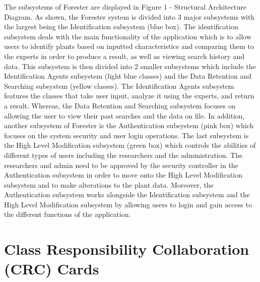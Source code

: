 \documentclass[]{article}
\begin{document}
The subsystems of Forester are displayed in Figure 1 - Structural Architecture Diagram. As shown, the Forester system is divided into 3 major subsystems with the largest being the Identification subsystem (blue box). The identification subsystem deals with the main functionality of the application which is to allow users to identify plants based on inputted characteristics and comparing them to the experts in order to produce a result, as well as viewing search history and data. This subsystem is then divided into 2 smaller subsystems which include the Identification Agents subsystem (light blue classes) and the Data Retention and Searching subsystem (yellow classes). The Identification Agents subsystem features the classes that take user input, analyze it using the experts, and return a result. Whereas, the Data Retention and Searching subsystem focuses on allowing the user to view their past searches and the data on file. In addition, another subsystem of Forester is the Authentication subsystem (pink box) which focuses on the system security and user login operations. The last subsystem is the High Level Modification subsystem (green box) which controls the abilities of different types of users including the researchers and the administration. The researchers and admin need to be approved by the security controller in the Authentication subsystem in order to move onto the High Level Modification subsystem and to make alterations to the plant data. Moreover, the Authentication subsystem works alongside the Identification subsystem and the High Level Modification subsystem by allowing users to login and gain access to the different functions of the application. 
\clearpage

	
\section{Class Responsibility Collaboration (CRC) Cards}
\label{sec:class_responsibility_collaboration_crc_cards}
\end{document}
